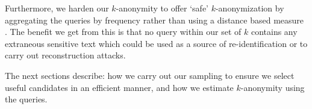 \documentclass[letterpaper]{article}
\begin{document}

Furthermore, we harden our $k$-anonymity to offer `safe' $k$-anonymization by aggregating the queries by frequency rather than using a distance based measure \cite{lefevre2006mondrian}. The benefit we get from this is that no query within our set of $k$ contains any extraneous sensitive text which could be used as a source of re-identification or to carry out reconstruction attacks.

The next sections describe: how we carry out our sampling to ensure we select useful candidates in an efficient manner, and how we estimate $k$-anonymity using the queries.

\end{document}
